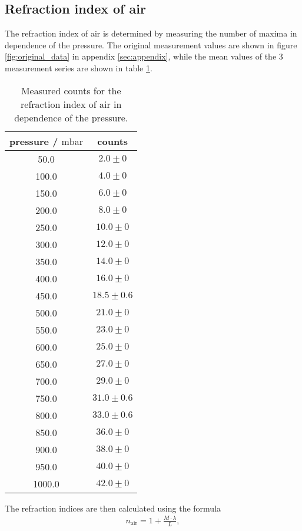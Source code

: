 \subsection{Refraction index of air}
\label{subsec:refraction_air}

The refraction index of air is determined by measuring the number of maxima in dependence of the pressure.
The original measurement values are shown in figure \ref{fig:original_data} in appendix \ref{sec:appendix}, while the mean values of the 3 measurement series are shown in table \ref{tab:refraction_air}.
\begin{table}[H]
    \centering
    \begin{tabular}{c c}
        \toprule
        pressure / $\si{\milli\bar}$  & counts \\    
        \midrule
        50.0 & $2.0\pm0$\\
        100.0 & $4.0\pm0$\\
        150.0 & $6.0\pm0$\\
        200.0 & $8.0\pm0$\\
        250.0 & $10.0\pm0$\\
        300.0 & $12.0\pm0$\\
        350.0 & $14.0\pm0$\\
        400.0 & $16.0\pm0$\\
        450.0 & $18.5\pm0.6$\\
        500.0 & $21.0\pm0$\\
        550.0 & $23.0\pm0$\\
        600.0 & $25.0\pm0$\\
        650.0 & $27.0\pm0$\\
        700.0 & $29.0\pm0$\\
        750.0 & $31.0\pm0.6$\\
        800.0 & $33.0\pm0.6$\\
        850.0 & $36.0\pm0$\\
        900.0 & $38.0\pm0$\\
        950.0 & $40.0\pm0$\\
        1000.0 & $42.0\pm0$\\
    \end{tabular}
    \caption{Measured counts for the refraction index of air in dependence of the pressure.}
    \label{tab:refraction_air}
\end{table}
\noindent
The refraction indices are then calculated using the formula
\begin{align}
    n_{\text{air}} = 1 + \frac{M\cdot\lambda}{L},
\end{align}
